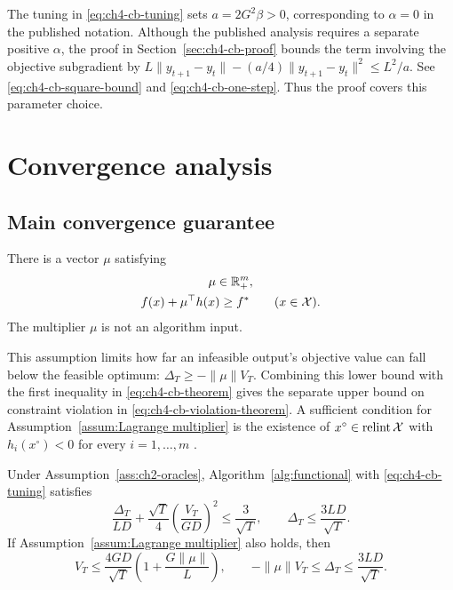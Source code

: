 The tuning in \eqref{eq:ch4-cb-tuning} sets $a=2G^2\beta>0$,
corresponding to $\alpha=0$ in the published notation. Although the
published analysis requires a separate positive $\alpha$, the proof in
Section~\ref{sec:ch4-cb-proof} bounds the term involving the objective subgradient by
$L\|y_{t+1}-y_t\|-(a/4)\|y_{t+1}-y_t\|^2\le L^2/a$.
See \eqref{eq:ch4-cb-square-bound} and \eqref{eq:ch4-cb-one-step}.
Thus the proof covers this parameter choice.

\section{Convergence analysis}
\label{sec:ch4-convergence}
\subsection{Main convergence guarantee}

\begin{Thm:Assumption}\label{assum:Lagrange multiplier}
There is a vector $\mu$ satisfying
\begin{equation}\label{eq:ch4-cb-multiplier}
\begin{gathered}
\mu\in\mathbb{R}_+^m,\\
f(x)+\mu^\top h(x)\ge f^*\qquad(x\in\mathcal{X}).
\end{gathered}
\end{equation}
The multiplier $\mu$ is not an algorithm input.
\end{Thm:Assumption}
This assumption limits how far an infeasible output's objective value can
fall below the feasible optimum: $\Delta_T\ge-\|\mu\|V_T$. Combining this
lower bound with the first inequality in \eqref{eq:ch4-cb-theorem} gives
the separate upper bound on constraint violation in
\eqref{eq:ch4-cb-violation-theorem}. A sufficient condition for
Assumption~\ref{assum:Lagrange multiplier} is the existence of
$x^\circ\in\operatorname{relint}\mathcal{X}$ with $h_i(x^\circ)<0$ for every
$i=1,\ldots,m$ \cite{boyd_vandenberghe_2004}.

\begin{Thm:Theorem}\label{thm:ch4-cb-guarantee}
Under Assumption~\ref{ass:ch2-oracles}, Algorithm~\ref{alg:functional}
with \eqref{eq:ch4-cb-tuning} satisfies
\begin{equation}\label{eq:ch4-cb-theorem}
\frac{\Delta_T}{LD}
+\frac{\sqrt T}{4}\left(\frac{V_T}{GD}\right)^2
\le\frac3{\sqrt T},
\qquad \Delta_T\le\frac{3LD}{\sqrt T}.
\end{equation}
If Assumption~\ref{assum:Lagrange multiplier} also holds, then
\begin{equation}\label{eq:ch4-cb-violation-theorem}
V_T\le\frac{4GD}{\sqrt T}\left(1+\frac{G\|\mu\|}{L}\right),
\qquad -\|\mu\|V_T\le\Delta_T\le\frac{3LD}{\sqrt T}.
\end{equation}
\end{Thm:Theorem}

